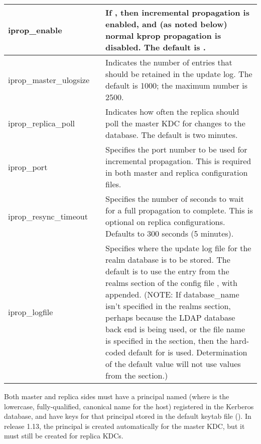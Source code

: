 \documentclass[letterpaper,10pt,english]{sphinxmanual}
\begin{document}
\begin{savenotes}\sphinxattablestart
\centering
\begin{tabulary}{\linewidth}[t]{|T|T|T|}
\hline

iprop\_enable
&
&
If , then incremental propagation is enabled, and (as noted below) normal kprop propagation is disabled. The default is .
\\
\hline
iprop\_master\_ulogsize
&
&
Indicates the number of entries that should be retained in the update log. The default is 1000; the maximum number is 2500.
\\
\hline
iprop\_replica\_poll
&
&
Indicates how often the replica should poll the master KDC for changes to the database. The default is two minutes.
\\
\hline
iprop\_port
&
&
Specifies the port number to be used for incremental propagation. This is required in both master and replica configuration files.
\\
\hline
iprop\_resync\_timeout
&
&
Specifies the number of seconds to wait for a full propagation to complete. This is optional on replica configurations.  Defaults to 300 seconds (5 minutes).
\\
\hline
iprop\_logfile
&
&
Specifies where the update log file for the realm database is to be stored. The default is to use the  entry from the realms section of the config file {\hyperref[\detokenize{admin/conf_files/kdc_conf:kdc-conf-5}]{}}, with  appended. (NOTE: If database\_name isn’t specified in the realms section, perhaps because the LDAP database back end is being used, or the file name is specified in the  section, then the hard-coded default for  is used. Determination of the   default value will not use values from the  section.)
\\
\hline
\end{tabulary}
\par
\sphinxattableend\end{savenotes}

Both master and replica sides must have a principal named
 (where  is the lowercase,
fully-qualified, canonical name for the host) registered in the
Kerberos database, and have keys for that principal stored in the
default keytab file ({\hyperref[\detokenize{mitK5defaults:paths}]{}}).  In release 1.13, the
 principal is created automatically for the master
KDC, but it must still be created for replica KDCs.
\end{document}
